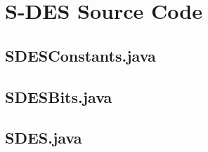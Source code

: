 \documentclass[]{article}
\begin{document}
\vspace*{-0.8cm}
	\section*{S-DES Source Code}

\subsection*{SDESConstants.java}
\pagebreak{}
\subsection*{SDESBits.java}
\pagebreak{}
\subsection*{SDES.java}
\pagebreak{}


\break
\setlength{}
\printbibliography[title={References}]

\end{document}
